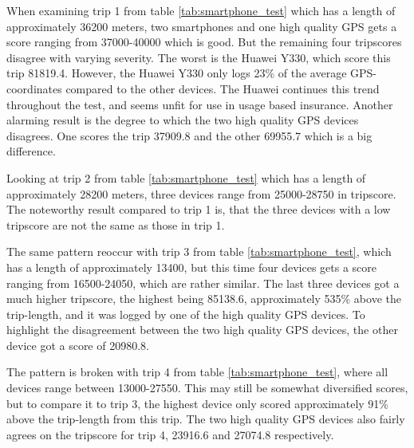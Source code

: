 When examining trip 1 from table \ref{tab:smartphone_test} which has a length of approximately 36200 meters, two smartphones and one high quality GPS gets a score ranging from 37000-40000 which is good. But the remaining four tripscores disagree with varying severity. The worst is the Huawei Y330, which score this trip 81819.4. However, the Huawei Y330 only logs 23\% of the average GPS-coordinates compared to the other devices. The Huawei continues this trend throughout the test, and seems unfit for use in usage based insurance. Another alarming result is the degree to which the two high quality GPS devices disagrees. One scores the trip 37909.8 and the other 69955.7 which is a big difference.

Looking at trip 2 from table \ref{tab:smartphone_test} which has a length of approximately 28200 meters, three devices range from 25000-28750 in tripscore. The noteworthy result compared to trip 1 is, that the three devices with a low tripscore are not the same as those in trip 1.

The same pattern reoccur with trip 3 from table \ref{tab:smartphone_test}, which has a length of approximately 13400, but this time four devices gets a score ranging from 16500-24050, which are rather similar. The last three devices got a much higher tripscore, the highest being 85138.6, approximately 535\% above the trip-length, and it was logged by one of the high quality GPS devices. To highlight the disagreement between the two high quality GPS devices, the other device got a score of 20980.8. 

The pattern is broken with trip 4 from table \ref{tab:smartphone_test}, where all devices range between 13000-27550. This may still be somewhat diversified scores, but to compare it to trip 3, the highest device only scored approximately 91\% above the trip-length from this trip. The two high quality GPS devices also fairly agrees on the tripscore for trip 4, 23916.6 and 27074.8 respectively. 

